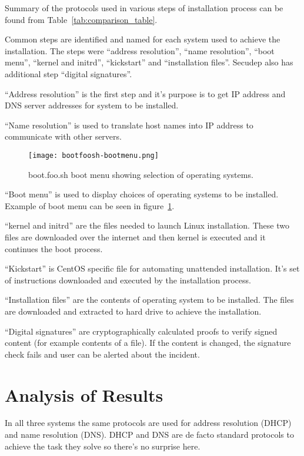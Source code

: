 Summary of the protocols used in various steps of installation process
can be found from Table~\ref{tab:comparison_table}.

Common steps are identified and named for each system used to achieve
the installation. The steps were ``address resolution'', ``name
resolution'', ``boot menu'', ``kernel and initrd'', ``kickstart'' and
``installation files''. Secudep also has additional step ``digital
signatures''.

``Address resolution'' is the first step and it's purpose is to get
IP address and DNS server addresses for system to be installed.

``Name resolution'' is used to translate host names into IP address to
communicate with other servers.

\begin{figure}[h]
  \texttt{[image: bootfoosh-bootmenu.png]}
  \caption{boot.foo.sh boot menu showing selection of operating
    systems.\label{fig:bootmenu}}
\end{figure}

``Boot menu'' is used to display choices of operating systems to be
installed. Example of boot menu can be seen in figure~\ref{fig:bootmenu}.

``kernel and initrd'' are the files needed to launch Linux
installation. These two files are downloaded over the internet and
then kernel is executed and it continues the boot process.

``Kickstart'' is CentOS specific file for automating unattended
installation. It's set of instructions downloaded and executed by the
installation process.

``Installation files'' are the contents of operating system to be
installed. The files are downloaded and extracted to hard drive to
achieve the installation.

``Digital signatures'' are cryptographically calculated proofs to
verify signed content (for example contents of a file). If the content
is changed, the signature check fails and user can be alerted about
the incident.

\section{Analysis of Results}

In all three systems the same protocols are used for address
resolution (DHCP) and name resolution (DNS). DHCP and DNS are de facto
standard protocols to achieve the task they solve so there's no
surprise here.

